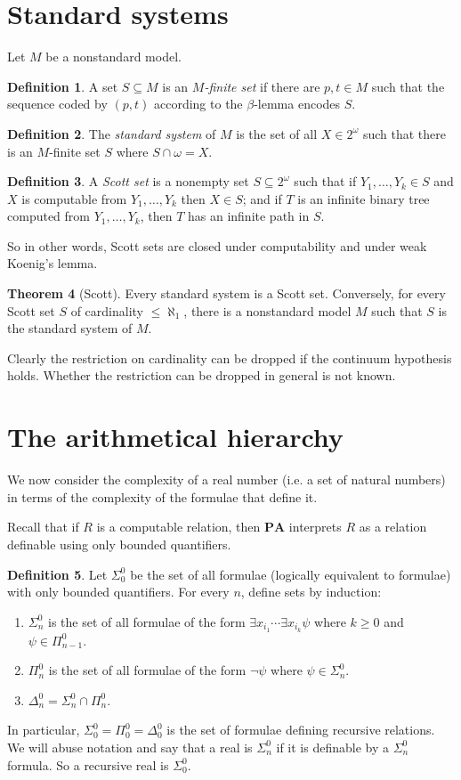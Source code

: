 \documentclass[12pt]{report}
\newcommand{\PA}{\mathbf{PA}}
\newcommand{\dfn}[1]{\emph{#1}\index{#1}}
\theoremstyle{definition}
\newtheorem{theorem}{Theorem}[chapter]
\newtheorem{definition}[theorem]{Definition}
\begin{document}
\section{Standard systems}
Let $M$ be a nonstandard model.
\begin{definition}
A set $S \subseteq M$ is an \dfn{$M$-finite set} if there are $p,t \in M$ such that the sequence coded by $(p, t)$ according to the $\beta$-lemma encodes $S$.
\end{definition}
\begin{definition}
The \dfn{standard system} of $M$ is the set of all $X \in 2^\omega$ such that there is an $M$-finite set $S$ where $S \cap \omega = X$.
\end{definition}
\begin{definition}
A \dfn{Scott set} is a nonempty set $S \subseteq 2^\omega$ such that if $Y_1, \dots, Y_k \in S$ and $X$ is computable from $Y_1, \dots, Y_k$ then $X \in S$; and if $T$ is an infinite binary tree computed from $Y_1, \dots, Y_k$, then $T$ has an infinite path in $S$.
\end{definition}
So in other words, Scott sets are closed under computability and under weak Koenig's lemma.
\begin{theorem}[Scott]
Every standard system is a Scott set. Conversely, for every Scott set $S$ of cardinality $\leq \aleph_1$, there is a nonstandard model $M$ such that $S$ is the standard system of $M$.
\end{theorem}
Clearly the restriction on cardinality can be dropped if the continuum hypothesis holds. Whether the restriction can be dropped in general is not known.

\section{The arithmetical hierarchy}
We now consider the complexity of a real number (i.e. a set of natural numbers) in terms of the complexity of the formulae that define it.

Recall that if $R$ is a computable relation, then $\PA$ interprets $R$ as a relation definable using only bounded quantifiers.
\begin{definition}
Let $\Sigma_0^0$ be the set of all formulae (logically equivalent to formulae) with only bounded quantifiers. For every $n$, define sets by induction:
\begin{enumerate}
\item $\Sigma_n^0$ is the set of all formulae of the form $\exists x_{i_1} \cdots \exists x_{i_k} \psi$ where $k \geq 0$ and $\psi \in \Pi_{n-1}^0$.
\item $\Pi_n^0$ is the set of all formulae of the form $\neg \psi$ where $\psi \in \Sigma_n^0$.
\item $\Delta_n^0 = \Sigma_n^0 \cap \Pi_n^0$.
\end{enumerate}
\end{definition}
In particular, $\Sigma_0^0 = \Pi_0^0 = \Delta_0^0$ is the set of formulae defining recursive relations.
We will abuse notation and say that a real is $\Sigma_n^0$ if it is definable by a $\Sigma_n^0$ formula.
So a recursive real is $\Sigma_0^0$.
\end{document}
